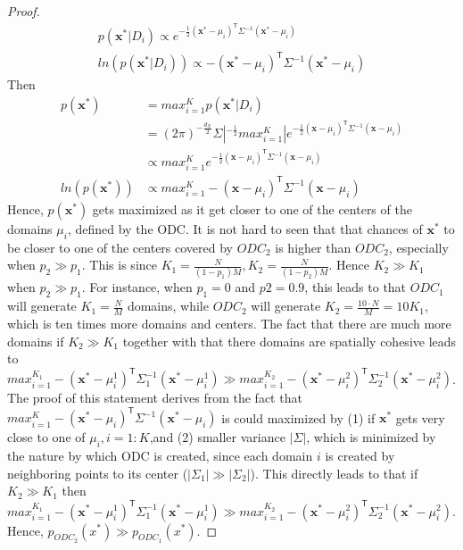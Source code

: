 \begin{proof}
\begin{equation}
\begin{split}
p(\textbf{x}^*|D_i) \propto  e^{-\frac{1}{2} (\textbf{x}^*-\mu_i)^\mathsf{T} \Sigma^{-1}
 (\textbf{x}^*-\mu_i)}  \\
ln(p(\textbf{x}^*|D_i)) \propto  - (\textbf{x}^*-\mu_i)^\mathsf{T} \Sigma^{-1}
 (\textbf{x}^*-\mu_i)
\end{split}
\end{equation}
Then 
\begin{equation}
\begin{split}
p(\textbf{x}^*) & =   max_{i=1}^{K} p(\textbf{x}^*|D_i) 
\\ 
& = (2 \pi)^{-\frac{d_X}{2}} \Sigma|^{-\frac{1}{2}} max_{i=1}^{K}  | e^{-\frac{1}{2} (\textbf{x}-\mu_i)^\mathsf{T} \Sigma^{-1}
 (\textbf{x}-\mu_i)} \\
 & \propto  max_{i=1}^{K}  e^{-\frac{1}{2} (\textbf{x}-\mu_i)^\mathsf{T} \Sigma^{-1} (\textbf{x}-\mu_i)} \\
ln( p(\textbf{x}^*)) & \propto max_{i=1}^{K}-  (\textbf{x}-\mu_i)^\mathsf{T} \Sigma^{-1}(\textbf{x}-\mu_i)
\end{split}
\end{equation}
Hence,  $p(\textbf{x}^*)$ gets maximized as it get closer to one of the centers of the domains $\mu_i$, defined by the ODC.  It is not hard to seen that  that chances of $\textbf{x}^*$ to be closer to one of the centers covered by $ODC_2$ is higher than  $ODC_2$, especially when $p_2 \gg p_1$.  This is since $K_1 = \frac{N}{(1-p_1)M}, K_2 = \frac{N}{(1-p_2)M}$. Hence $K_2 \gg K_1$ when $p_2 \gg p_1$. For instance, when $p_1=0$ and  $p2=0.9$, this leads to that $ODC_1$ will generate $K_1 = \frac{N}{M}$ domains, while $ODC_2$ will generate    $K_2= \frac{10 \cdot N}{M} = 10 K_1$, which is ten times more domains and centers. The fact that there are much more domains if $K_2 \gg K_1$ together with that there domains are spatially cohesive leads to $max_{i=1}^{K_1}-  (\textbf{x}^*-\mu^1_i)^\mathsf{T} \Sigma_1^{-1}(\textbf{x}^*-\mu^1_i) \gg max_{i=1}^{K_2}-  (\textbf{x}^*-\mu^2_i)^\mathsf{T} \Sigma_2^{-1}(\textbf{x}^*-\mu^2_i)$. The proof of this statement derives from the fact that $max_{i=1}^{K}   - (\textbf{x}^*-\mu_i)^\mathsf{T} \Sigma^{-1}(\textbf{x}^*-\mu_i)$ is could maximized by (1) if   $\textbf{x}^*$ gets very close to one of  $\mu_i, i=1:K$,and (2) smaller variance $|\Sigma|$, which is minimized by the nature by which ODC is created, since each domain $i$ is created by neighboring points to its center (\ie $|\Sigma_1| \gg |\Sigma_2|$). This directly leads to that if $K_2 \gg K_1$ then  
$max_{i=1}^{K_1}-  (\textbf{x}^*-\mu^1_i)^\mathsf{T} \Sigma_1^{-1}(\textbf{x}^*-\mu^1_i) \gg max_{i=1}^{K_2}-  (\textbf{x}^*-\mu^2_i)^\mathsf{T} \Sigma_2^{-1}(\textbf{x}^*-\mu^2_i)$. Hence,  $p_{ODC_2}(x^*) \gg p_{ODC_1}(x^*)$. 



\end{proof}

